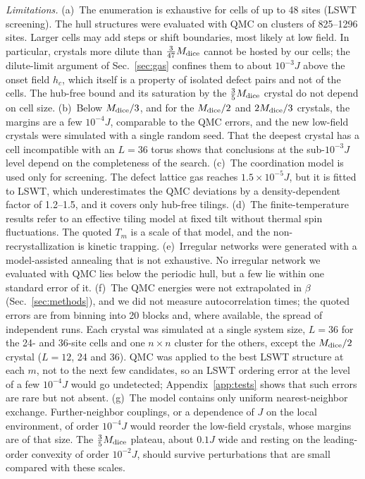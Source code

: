 \documentclass[prb,twocolumn,amsmath,amssymb,floatfix]{revtex4-2}
\newcommand{\Md}{M_{\rm dice}}
\begin{document}
\emph{Limitations.} (a)~The enumeration is exhaustive for cells of up to 48 sites (LSWT screening). The hull structures were evaluated with QMC on clusters of 825--1296 sites. Larger cells may add steps or shift boundaries, most likely at low field. In particular, crystals more dilute than $\frac3{47}\Md$ cannot be hosted by our cells; the dilute-limit argument of Sec.~\ref{sec:gas} confines them to about $10^{-3}J$ above the onset field $h_c$, which itself is a property of isolated defect pairs and not of the cells. The hub-free bound and its saturation by the $\frac35\Md$ crystal do not depend on cell size. (b)~Below $\Md/3$, and for the $\Md/2$ and $2\Md/3$ crystals, the margins are a few $10^{-4}J$, comparable to the QMC errors, and the new low-field crystals were simulated with a single random seed. That the deepest crystal has a cell incompatible with an $L=36$ torus shows that conclusions at the sub-$10^{-3}J$ level depend on the completeness of the search. (c)~The coordination model is used only for screening. The defect lattice gas reaches $1.5\times10^{-5}J$, but it is fitted to LSWT, which underestimates the QMC deviations by a density-dependent factor of 1.2--1.5, and it covers only hub-free tilings. (d)~The finite-temperature results refer to an effective tiling model at fixed tilt without thermal spin fluctuations. The quoted $T_m$ is a scale of that model, and the non-recrystallization is kinetic trapping. (e)~Irregular networks were generated with a model-assisted annealing that is not exhaustive. No irregular network we evaluated with QMC lies below the periodic hull, but a few lie within one standard error of it. (f)~The QMC energies were not extrapolated in $\beta$ (Sec.~\ref{sec:methods}), and we did not measure autocorrelation times; the quoted errors are from binning into 20 blocks and, where available, the spread of independent runs. Each crystal was simulated at a single system size, $L=36$ for the 24- and 36-site cells and one $n\times n$ cluster for the others, except the $\Md/2$ crystal ($L=12$, 24 and 36). QMC was applied to the best LSWT structure at each $m$, not to the next few candidates, so an LSWT ordering error at the level of a few $10^{-4}J$ would go undetected; Appendix~\ref{app:tests} shows that such errors are rare but not absent. (g)~The model contains only uniform nearest-neighbor exchange. Further-neighbor couplings, or a dependence of $J$ on the local environment, of order $10^{-4}J$ would reorder the low-field crystals, whose margins are of that size. The $\frac35\Md$ plateau, about $0.1J$ wide and resting on the leading-order convexity of order $10^{-2}J$, should survive perturbations that are small compared with these scales.
\end{document}
